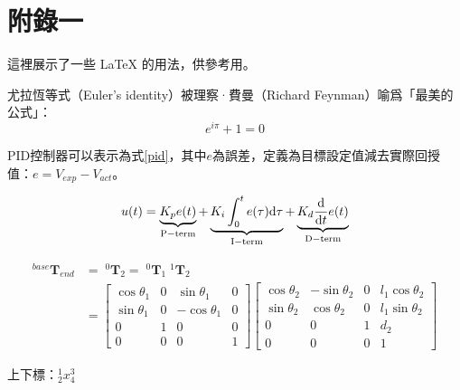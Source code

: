 \clearpage
\appendix
\chapter{附錄一}
\label{appendix}

這裡展示了一些 \LaTeX{} 的用法，供參考用。

\vspace{2cm}

尤拉恆等式（Euler's identity）被理察·費曼（Richard Feynman）喻爲「最美的公式」：
\begin{equation}
    e^{i \pi} + 1 = 0 \label{euler-identity}
\end{equation}

\vspace{2cm}

PID控制器可以表示為式\eqref{pid}，其中$e$為誤差，定義為目標設定值減去實際回授值：$e=V_{exp}-V_{act}$。

\begin{equation}
    u(t) = \underbrace{K_p e(t)}_{\rm P-term}
         + \underbrace{K_i \int_{0}^{t} e(\tau)\mathrm{d}\tau}_{\rm I-term}
         + \underbrace{K_d \frac{\mathrm{d}}{\mathrm{d}t} e(t)}_{\rm D-term}
    \label{pid}
\end{equation}

\begin{align}
^{base}\mathbf{T}_{end} &= \; ^0\mathbf{T}_2 = \; ^0\mathbf{T}_1 \; ^1\mathbf{T}_2 \\
&=
\begin{bmatrix}
\cos \theta_1&0&\sin \theta_1&0\\
\sin \theta_1&0&-\cos \theta_1&0\\
0&1&0&0\\
0&0&0&1
\end{bmatrix}
\begin{bmatrix}
\cos \theta_2&-\sin \theta_2&0&l_1\cos \theta_2\\
\sin \theta_2&\cos \theta_2&0&l_1\sin \theta_2\\
0&0&1&d_2\\
0&0&0&1
\end{bmatrix}
\end{align}

上下標：$^1_2x^3_4$
